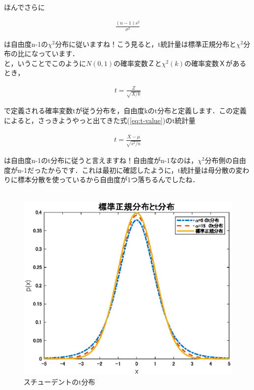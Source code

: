 \documentclass[11pt,a4paper]{ujreport} 	%
\begin{document}
ほんでさらに

\begin{align}
  \frac{(n-1)s^2}{\sigma^2}
\end{align}

は自由度n-1の$\chi^2$分布に従いますね！こう見ると，t統計量は標準正規分布と$\chi^2$分布の比になっています．\\

と，いうことでこのように$N(0,1)$の確率変数Ｚと$\chi^2(k)$の確率変数Ｘがあるとき，

\begin{align}
  t = \frac{Z}{\sqrt{X/k}}
\end{align}

で定義される確率変数tが従う分布を，自由度kのt分布と定義します．この定義によると，さっきようやっと出てきた式(\ref{eq:t-value})のt統計量

\begin{align}
  t = \frac{\bar{X}- \mu}{\sqrt{s^2/n}}
\end{align}

は自由度n-1のt分布に従うと言えますね！自由度がn-1なのは，$\chi^2$分布側の自由度がn-1だったからです．これは最初に確認したように，t統計量は母分散の変わりに標本分散を使っているから自由度が1つ落ちるんでしたね．\\\\

\begin{figure}[H]
  \centering
  \includegraphics{../figures/student.eps}
  \caption{スチューデントのt分布}
\end{figure}
\end{document}

